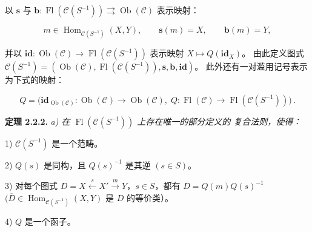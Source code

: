 \clearpage
{}%
\begingroup
\small
\setlength{\emergencystretch}{1.5em}%
\setlength{\abovedisplayskip}{1pt plus 1pt minus 1pt}%
\setlength{\belowdisplayskip}{1pt plus 1pt minus 1pt}%

\noindent 以 $\mathbf{s}$ 与 $\mathbf{b}\colon
\operatorname{Fl}(\mathcal C(S^{-1}))\rightrightarrows
\operatorname{Ob}(\mathcal C)$ 表示映射：

\[
  m\in\operatorname{Hom}_{\mathcal C(S^{-1})}(X,Y),\qquad
  \mathbf{s}(m)=X,\qquad \mathbf{b}(m)=Y,
\]

\noindent 并以 $\mathbf{id}\colon\operatorname{Ob}(\mathcal C)
\to\operatorname{Fl}(\mathcal C(S^{-1}))$ 表示映射
$X\mapsto Q(\mathbf{id}_X)$。
%
由此定义图式
$\mathcal C(S^{-1})=(\operatorname{Ob}(\mathcal C),
\operatorname{Fl}(\mathcal C(S^{-1})),\mathbf{s},\mathbf{b},\mathbf{id})$。
此外还有一对滥用记号表示为下式的映射：

\[
  Q=\bigl(\mathbf{id}_{\operatorname{Ob}(\mathcal C)}\colon
  \operatorname{Ob}(\mathcal C)\to\operatorname{Ob}(\mathcal C),\;
  Q\colon\operatorname{Fl}(\mathcal C)\to
  \operatorname{Fl}(\mathcal C(S^{-1}))\bigr)\,.
\]

\smallskip
\noindent\textbf{定理 2.2.2.}\quad
\begingroup\itshape
{}%
a) 在 $\operatorname{Fl}(\mathcal C(S^{-1}))$ 上存在唯一的部分定义的
复合法则，使得：

\par\noindent\hspace*{2em}1) $\mathcal C(S^{-1})$ 是一个范畴。

\par\noindent\hspace*{2em}2) $Q(s)$ 是同构，且 $Q(s)^{-1}$ 是其逆
$(s\in S)$。

\par\noindent\hspace*{2em}3) 对每个图式
$D=X\xleftarrow{s}X'\xrightarrow{m}Y$，$s\in S$，都有
$\overline D=Q(m)Q(s)^{-1}$
$(\overline D\in\operatorname{Hom}_{\mathcal C(S^{-1})}(X,Y)$ 是
$D$ 的等价类）。

\par\noindent\hspace*{2em}4) $Q$ 是一个函子。

